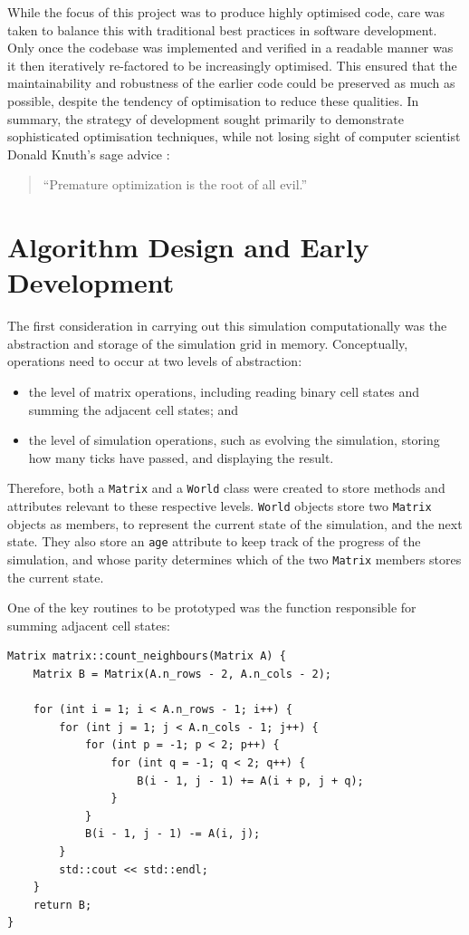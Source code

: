 \documentclass[12pt]{article}
\begin{document}
While the focus of this project was to produce highly optimised code,
care was taken to balance this with traditional best practices in software development.
Only once the codebase was implemented and verified in a readable manner was it then iteratively re-factored to be increasingly optimised.
This ensured that the maintainability and robustness of the earlier code could be preserved as much as possible,
despite the tendency of optimisation to reduce these qualities.
In summary, the strategy of development sought primarily to demonstrate sophisticated optimisation techniques,
while not losing sight of computer scientist Donald Knuth's sage advice \cite{10.1145/356635.356640}:

\begin{quote}
    ``Premature optimization is the root of all evil.''
\end{quote}

\section{Algorithm Design and Early Development}

The first consideration in carrying out this simulation computationally was the abstraction and storage of the simulation grid in memory.
Conceptually, operations need to occur at two levels of abstraction:
\begin{itemize}
    \item the level of matrix operations, including reading binary cell states and summing the adjacent cell states; and
    \item the level of simulation operations, such as evolving the simulation, storing how many ticks have passed, and displaying the result.
\end{itemize}

Therefore, both a \texttt{Matrix} and a \texttt{World} class were created to store methods and attributes relevant to these respective levels.
\texttt{World} objects store two \texttt{Matrix} objects as members, to represent the current state of the simulation, and the next state.
They also store an \texttt{age} attribute to keep track of the progress of the simulation,
and whose parity determines which of the two \texttt{Matrix} members stores the current state.

One of the key routines to be prototyped was the function responsible for summing adjacent cell states:

\begin{lstlisting}
Matrix matrix::count_neighbours(Matrix A) {
    Matrix B = Matrix(A.n_rows - 2, A.n_cols - 2);

    for (int i = 1; i < A.n_rows - 1; i++) {
        for (int j = 1; j < A.n_cols - 1; j++) {
            for (int p = -1; p < 2; p++) {
                for (int q = -1; q < 2; q++) {
                    B(i - 1, j - 1) += A(i + p, j + q);
                }
            }
            B(i - 1, j - 1) -= A(i, j);
        }
        std::cout << std::endl;
    }
    return B;
}
\end{lstlisting}
\end{document}
